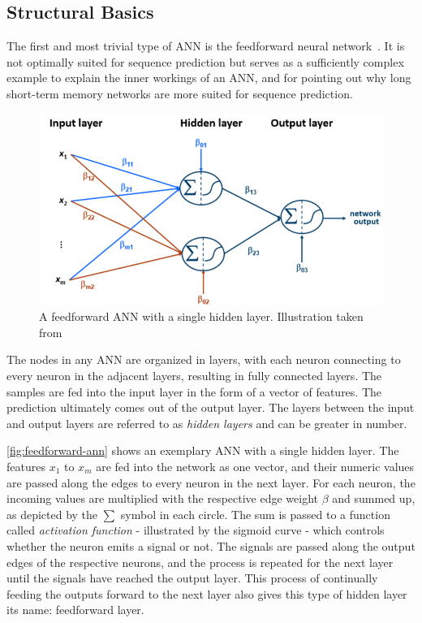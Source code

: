 \subsection{Structural Basics}\label{sec:feedforward-networks}
The first and most trivial type of ANN is the feedforward neural network~\cite{schmidhuber2015deep}. It is not optimally suited for sequence prediction but serves as a sufficiently complex example to explain the inner workings of an ANN, and for pointing out why long short-term memory networks are more suited for sequence prediction.

\begin{figure}[!htb]
    \centering
    \includegraphics[width=.85\textwidth]{gfx/feedforward-neural-network.png}
    \caption[A feedforward ANN with a single hidden layer]{A feedforward ANN with a single hidden layer. Illustration taken from~\cite{lessmannBADS}}
    \label{fig:feedforward-ann}
\end{figure}

The nodes in any ANN are organized in layers, with each neuron connecting to every neuron in the adjacent layers, resulting in fully connected layers. The samples are fed into the input layer in the form of a vector of features. The prediction ultimately comes out of the output layer. The layers between the input and output layers are referred to as \textit{hidden layers} and can be greater in number.

\autoref{fig:feedforward-ann} shows an exemplary ANN with a single hidden layer. The features $x_1$ to $x_m$ are fed into the network as one vector, and their numeric values are passed along the edges to every neuron in the next layer. For each neuron, the incoming values are multiplied with the respective edge weight $\beta$ and summed up, as depicted by the $\sum$ symbol in each circle. The sum is passed to a function called \textit{activation function} - illustrated by the sigmoid curve - which controls whether the neuron emits a signal or not. The signals are passed along the output edges of the respective neurons, and the process is repeated for the next layer until the signals have reached the output layer.
This process of continually feeding the outputs forward to the next layer also gives this type of hidden layer its name: feedforward layer.

